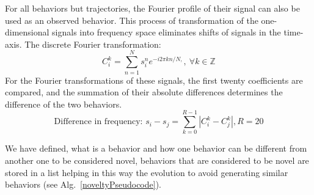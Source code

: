 For all behaviors but trajectories, the Fourier profile of their signal can also be used as an observed behavior. This process of transformation of the one-dimensional signals into frequency space eliminates shifts of signals in the time-axis. The discrete Fourier transformation:
\begin{equation}
C_i^k = \sum_{n=1}^{N} s_i^n e^{-i 2 \pi k n/N,},~\forall k \in \mathbb{Z}
\end{equation}
For the Fourier transformations of these signals, the first twenty coefficients are compared, and the summation of their absolute differences determines the difference of the two behaviors.
\begin{equation}
\text{Difference in frequency: } s_i - s_j = \sum_{k=0}^{R-1} | C_i^k - C_j^k |, R=20
\end{equation}

We have defined, what is a behavior and how one behavior can be different from another one to be considered novel, behaviors that are considered to be novel are stored in a list helping in this way the evolution to avoid generating similar behaviors (see Alg.~\ref{noveltyPseudocode}).

